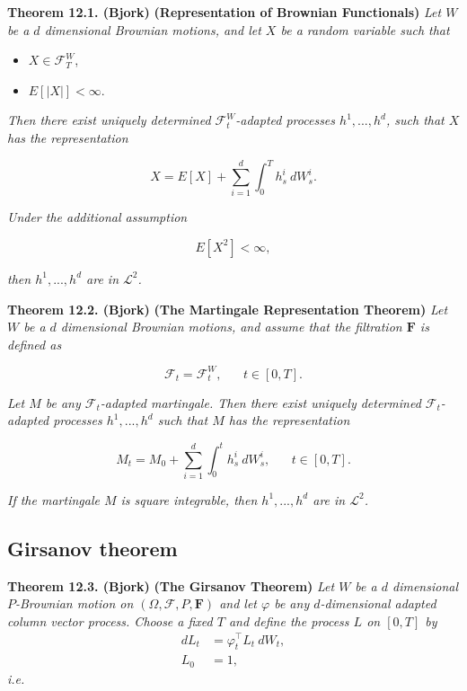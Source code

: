 \documentclass[a4paper,10pt,openany]{book}
\providecommand{\tightlist}{%
 \setlength{\itemsep}{0pt}\setlength{\parskip}{0pt}}
\begin{document}
\textbf{Theorem 12.1. (Bjork)} \textbf{(Representation of Brownian Functionals)} \emph{Let \(W\) be a \(d\) dimensional Brownian motions, and let \(X\) be a random variable such that}

\begin{itemize}
\tightlist
\item
  \(X\in\mathcal{F}^W_T\),
\item
  \(E[\vert X\vert]<\infty\).
\end{itemize}

\emph{Then there exist uniquely determined \(\mathcal{F}^W_t\)-adapted processes \(h^1,...,h^d\), such that \(X\) has the representation}

\[
X=E[X]+\sum_{i=1}^d\int_0^Th^i_s\ dW_s^i.\tag{12.2}
\]

\emph{Under the additional assumption}

\[
E[X^2]<\infty,
\]

\emph{then \(h^1,...,h^d\) are in \(\mathcal{L}^2\).}

\textbf{Theorem 12.2. (Bjork)} \textbf{(The Martingale Representation Theorem)} \emph{Let \(W\) be a \(d\) dimensional Brownian motions, and assume that the filtration \(\mathbf{F}\) is defined as}

\[
\mathcal{F}_t=\mathcal{F}^W_t,\hspace{20pt}t\in[0,T].
\]

\emph{Let \(M\) be any \(\mathcal{F}_t\)-adapted martingale. Then there exist uniquely determined \(\mathcal{F}_t\)-adapted processes \(h^1,...,h^d\) such that \(M\) has the representation}

\[
M_t=M_0+\sum_{i=1}^d\int_0^t h_s^i\ dW_s^i,\hspace{20pt}t\in[0,T].\tag{12.9}
\]

\emph{If the martingale \(M\) is square integrable, then \(h^1,...,h^d\) are in \(\mathcal{L}^2\).}

\hypertarget{girsanov-theorem}{%
\subsection{Girsanov theorem}\label{girsanov-theorem}}

\textbf{Theorem 12.3. (Bjork)} \textbf{(The Girsanov Theorem)} \emph{Let \(W\) be a \(d\) dimensional \(P\)-Brownian motion on \((\Omega,\mathcal{F},P,\mathbf{F})\) and let \(\varphi\) be any \(d\)-dimensional adapted column vector process. Choose a fixed \(T\) and define the process \(L\) on \([0,T]\) by}
\begin{align*}
dL_t&=\varphi^\top_t L_t\ dW_t,\tag{12.16}\\
L_0&=1,\tag{12.17}
\end{align*}
\emph{i.e.}
\end{document}
